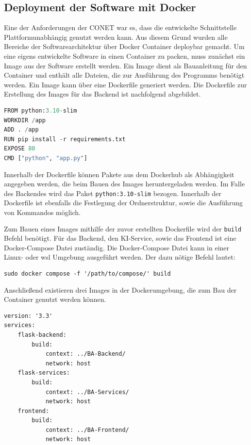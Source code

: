 \subsection{Deployment der Software mit Docker}
Eine der Anforderungen der CONET war es, dass die entwickelte Schnittstelle Plattformunabhängig genutzt werden kann. Aus diesem Grund wurden alle Bereiche der Softwarearchitektur über Docker Container deploybar gemacht. Um eine eigens entwickelte Software in einen Container zu packen, muss zunächst ein Image aus der Software erstellt werden. Ein Image dient als Bauanleitung für den Container und enthält alle Dateien, die zur Ausführung des Programms benötigt werden. Ein Image kann über eine Dockerfile generiert werden. Die Dockerfile zur Erstellung des Images für das Backend ist nachfolgend abgebildet.

\begin{lstlisting}[language=Python, caption={Beispiel einer Dockefile}]
FROM python:3.10-slim
WORKDIR /app
ADD . /app
RUN pip install -r requirements.txt
EXPOSE 80
CMD ["python", "app.py"]
\end{lstlisting}

Innerhalb der Dockerfile können Pakete aus dem Dockerhub als Abhängigkeit angegeben werden, die beim Bauen des Images heruntergeladen werden. Im Falle des Backendes wird das Paket \texttt{python:3.10-slim} bezogen. Innerhalb der Dockerfile ist ebenfalls die Festlegung der Ordnerstruktur, sowie die Ausführung von Kommandos möglich.

Zum Bauen eines Images mithilfe der zuvor erstellten Dockerfile wird der \texttt{build} Befehl benötigt. Für das Backend, den KI-Service, sowie das Frontend ist eine Docker-Compose Datei zuständig. Die Docker-Compose Datei kann in einer Linux- oder \ac{wsl} Umgebung ausgeführt werden. Der dazu nötige Befehl lautet:
\begin{lstlisting}[caption={Build Befehl zur Erstellung von Docker-Images aus einer Compose-Datei}]
sudo docker compose -f '/path/to/compose/' build
\end{lstlisting}
Anschließend existieren drei Images in der Dockerumgebung, die zum Bau der Container genutzt werden können. 

\begin{lstlisting}[caption={Docker-Compose-Datei zum Bauen der Docker-Images}]
version: '3.3'
services: 
    flask-backend:
        build: 
            context: ../BA-Backend/
            network: host
    flask-services:
        build:
            context: ../BA-Services/
            network: host
    frontend:
        build:
            context: ../BA-Frontend/
            network: host
\end{lstlisting}


